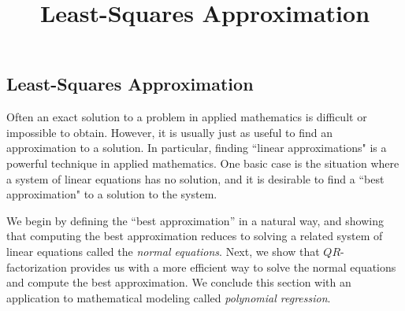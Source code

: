 \documentclass{ximera}
\title{Least-Squares Approximation} \license{CC BY-NC-SA 4.0}
\begin{document}
\begin{abstract}
\end{abstract}
\maketitle

\begin{onlineOnly}
\section*{Least-Squares Approximation}
\end{onlineOnly}

 

Often an exact solution to a problem in applied mathematics is difficult or impossible to obtain. However, it is usually just as useful to find an approximation to a solution. In particular, finding ``linear approximations" is a powerful technique in applied mathematics. One basic case is the situation where a system
of linear equations has no solution, and it is desirable to find a ``best approximation" to a solution to the
system. 

We begin by defining the ``best approximation'' in a natural way, and showing that computing the best approximation reduces to solving a related system of linear equations  called the \emph{normal equations}.  Next, we show that $QR$-factorization provides us with a more efficient way to solve the normal equations and compute the best approximation.  We conclude this section with an application to mathematical modeling called \emph{polynomial regression}. 
\end{document}
